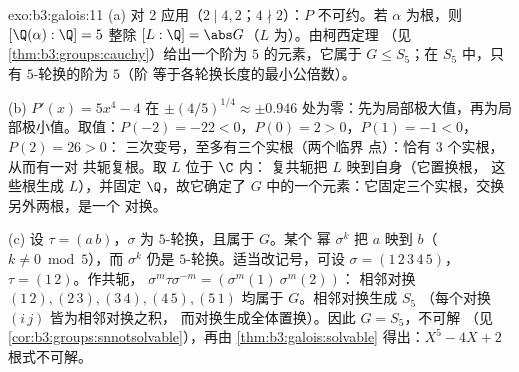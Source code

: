 \begin{solution}{exo:b3:galois:11}
(a) 对 $2$ 应用（$2 \mid 4, 2$；$4 \nmid 2$）：$P$
不可约。若 $\alpha$ 为根，则 $[\Q(\alpha):\Q] = 5$
整除 $[L:\Q] = \abs G$（$L$ 为）。由柯西定理
（见\cref{thm:b3:groups:cauchy}）给出一个阶为 $5$ 的元素，它属于
$G \leq S_5$；在 $S_5$ 中，只有 $5$-轮换的阶为 $5$（阶
等于各轮换长度的最小公倍数）。

(b) $P'(x) = 5x^4 - 4$ 在 $\pm(4/5)^{1/4} \approx \pm
0.946$ 处为零：先为局部极大值，再为局部极小值。取值：$P(-2)
= -22 < 0$，$P(0) = 2 > 0$，$P(1) = -1 < 0$，$P(2) = 26 > 0$：
三次变号，至多有三个实根（两个临界
点）：恰有 $3$ 个实根，从而有一对
共轭复根。取 $L$ 位于 $\C$ 内：
复共轭把 $L$ 映到自身（它置换根，
这些根生成 $L$），并固定 $\Q$，故它确定了
$G$ 中的一个元素：它固定三个实根，交换另外两根，是一个
对换。

(c) 设 $\tau = (a\,b)$，$\sigma$ 为 $5$-轮换，且属于 $G$。某个
幂 $\sigma^k$ 把 $a$ 映到 $b$（$k \ne 0 \bmod 5$），而
$\sigma^k$ 仍是 $5$-轮换。适当改记号，可设 $\sigma =
(1\,2\,3\,4\,5)$，$\tau = (1\,2)$。作共轭，
$\sigma^m\tau\sigma^{-m} = (\sigma^m(1)\ \sigma^m(2))$：
相邻对换 $(1\,2), (2\,3), (3\,4), (4\,5),
(5\,1)$ 均属于 $G$。相邻对换生成 $S_5$
（每个对换 $(i\,j)$ 皆为相邻对换之积，
而对换生成全体置换）。因此 $G = S_5$，不可解
（见\cref{cor:b3:groups:snnotsolvable}），再由
\cref{thm:b3:galois:solvable} 得出：$X^5 - 4X + 2$
根式不可解。
\end{solution}

